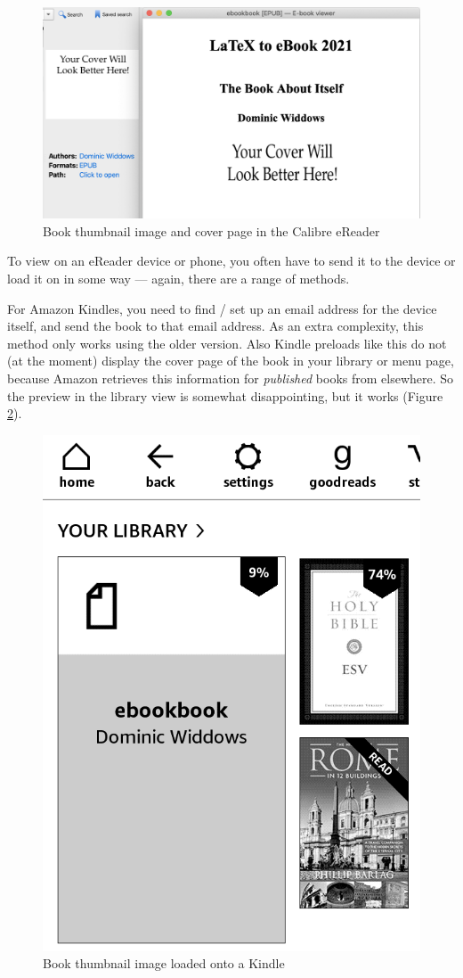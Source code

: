 \begin{figure}
\begin{center}
\includegraphics[width=\linewidth]{images/calibre_screenshot.png}
\caption{Book thumbnail image and cover page in the Calibre eReader}
\label{fig:calibre_screenshot}
\end{center}
\end{figure}

To view on an eReader device or phone, you often have to send it to
the device or load it on in some way --- again, there are a range of
methods.

For Amazon Kindles, you need to find / set up an email address for the
device itself, and send the book to that email address. As an extra
complexity, this method only works using the older 
version.  Also Kindle preloads like this do not (at the moment)
display the cover page of the book in your library or menu page,
because Amazon retrieves this information for {\em published} books
from elsewhere. So the preview in the library view is somewhat
disappointing, but it works (Figure \ref{fig:kindle_screenshot}).

\begin{figure}
\begin{center}
  \includegraphics[width=0.6\linewidth]{images/kindle_screenshot.png}
  \caption{Book thumbnail image loaded onto a Kindle}
  \label{fig:kindle_screenshot}
 \end{center}
\end{figure}

